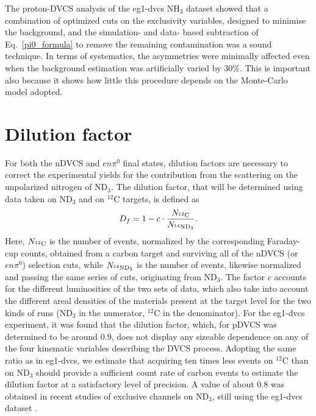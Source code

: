 %
The proton-DVCS analysis of the eg1-dvcs NH$_{3}$ dataset showed that a combination of optimized cuts on the exclusivity variables, designed to minimise the background, and the simulation- and data- based subtraction of Eq.~\ref{pi0_formula} to remove the remaining contamination was a sound technique. In terms of systematics, the asymmetries were minimally affected even when the background estimation was artificially varied by 30\%. This is important also because it shows how little this procedure depends on the Monte-Carlo model adopted. 

\section{Dilution factor}\label{sec_dilution}
For both the nDVCS and $en\pi^0$ final states, dilution factors are necessary to correct the experimental yields for the contribution from the scattering on the unpolarized nitrogen of ND$_3$. The dilution factor, that will be determined using data taken on ND$_3$ and on ${}^{12}$C targets, is defined as
\begin{equation}
D_f = 1-c\cdot\frac{N_{{}^{12}{\rm C}}}{N_{{}^{14}{\rm ND}_3}} \label{eq_dilution}.
\end{equation}
Here, $N_{{}^{12}{\rm C}}$ is the number of events, normalized by the corresponding Faraday-cup counts, obtained from a carbon target and surviving all of the nDVCS (or $en\pi^0$) selection cuts, while $N_{{}^{14}{\rm ND}_3}$ is the number of events, likewise normalized and passing the same series of cuts, originating from ND$_3$. The factor $c$ accounts for the different luminosities of the two sets of data, which also take into account the different areal densities of the materials 
present at the target level for the two kinds of runs (ND$_3$ in the numerator, ${}^{12}$C in the denominator). 
For the eg1-dvcs experiment, it was found that the dilution factor, which, for pDVCS was determined to be around 0.9, does not display any sizeable dependence on any of the four kinematic variables describing the DVCS process. 
Adopting the same ratio as in eg1-dvcs, we estimate that acquiring ten times less events on ${}^{12}$C than on ND$_3$ should provide a sufficient count rate of carbon events to estimate the dilution factor at a satisfactory level of precision. A value of about 0.8 was obtained in recent studies of exclusive channels on ND$_3$, still using the eg1-dvcs dataset \cite{peter_exclusive}.

